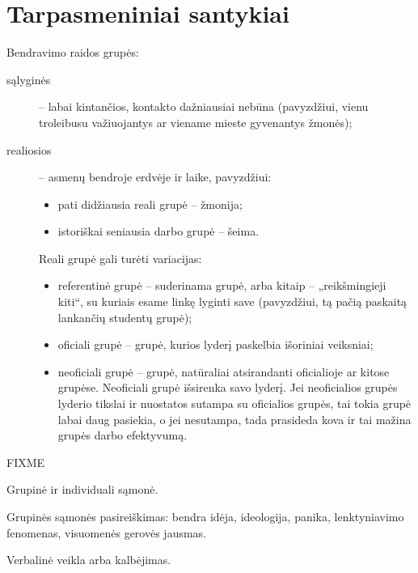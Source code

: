 \chapter{Tarpasmeniniai santykiai}

\label{tema:grupe}

Bendravimo raidos grupės:

\begin{description}
  \item[sąlyginės] – labai kintančios, kontakto dažniausiai nebūna 
    (pavyzdžiui, vienu troleibusu važiuojantys ar viename mieste gyvenantys 
    žmonės);
  \item[realiosios] – asmenų bendroje erdvėje ir laike, pavyzdžiui:
    \begin{itemize}
      \item pati didžiausia reali grupė – žmonija;
      \item istoriškai seniausia darbo grupė – šeima.
    \end{itemize}

    Reali grupė gali turėti variacijas:
    \begin{itemize}
      \item referentinė grupė – suderinama grupė, arba kitaip –
        „reikšmingieji kiti“, su kuriais esame linkę lyginti save 
        (pavyzdžiui, tą pačią paskaitą lankančių studentų grupė);
      \item oficiali grupė – grupė, kurios lyderį paskelbia išoriniai
        veiksniai;
      \item neoficiali grupė – grupė, natūraliai atsirandanti oficialioje
        ar kitose grupėse. Neoficiali grupė išsirenka savo lyderį. Jei
        neoficialios grupės lyderio tikslai ir nuostatos sutampa su
        oficialios grupės, tai tokia grupė labai daug pasiekia, o jei
        nesutampa, tada prasideda kova ir tai mažina grupės darbo 
        efektyvumą.
    \end{itemize}

\end{description}


FIXME

Grupinė ir individuali sąmonė.

Grupinės sąmonės pasireiškimas: bendra idėja, ideologija,
panika, lenktyniavimo fenomenas, visuomenės gerovės jausmas.

Verbalinė veikla arba kalbėjimas.

